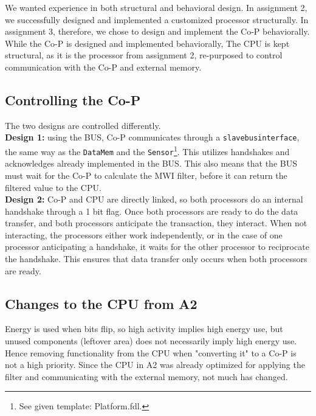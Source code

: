 We wanted experience in both structural and behavioral design. In assignment 2, we successfully designed and implemented a customized processor structurally. In assignment 3, therefore, we chose to design and implement the Co-P behaviorally. \\

While the Co-P is designed and implemented behaviorally, The CPU is kept structural, as it is the processor from assignment 2, re-purposed to control communication with the Co-P and external memory.

\subsection{Controlling the Co-P}

The two designs are controlled differently. \\

\textbf{Design 1:} using the BUS, Co-P communicates through a \texttt{slavebusinterface}, the same way as the \texttt{DataMem} and the \texttt{Sensor}\footnote{See given template: Platform.fdl.}. This utilizes handshakes and acknowledges already implemented in the BUS. This also means that the BUS must wait for the Co-P to calculate the MWI filter, before it can return the filtered value to the CPU. \\

\textbf{Design 2:} Co-P and CPU are directly linked, so both processors do an internal handshake through a 1 bit flag. Once both processors are ready to do the data transfer, and both processors anticipate the transaction, they interact. When not interacting, the processors either work independently, or in the case of one processor anticipating a handshake, it waits for the other processor to reciprocate the handshake. This ensures that data transfer only occurs when both processors are ready. \\


\subsection{Changes to the CPU from A2}
Energy is used when bits flip, so high activity implies high energy use, but unused components (leftover area) does not necessarily imply high energy use. Hence removing functionality from the CPU when "converting it" to a Co-P is not a high priority. Since the CPU in A2 was already optimized for applying the filter and communicating with the external memory, not much has changed. \\


